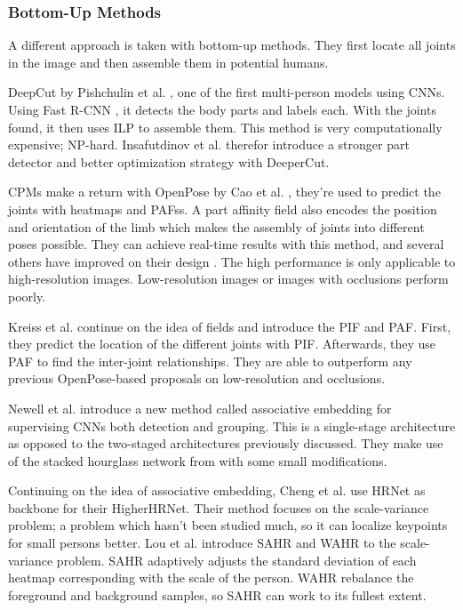 \subsubsection{Bottom-Up Methods}
A different approach is taken with bottom-up methods.
They first locate all joints in the image and then assemble them in potential humans.

DeepCut by Pishchulin et al. \cite{Pishchulin2015}, one of the first multi-person models using \glspl{CNN}.
Using Fast R-CNN \cite{Ren2015}, it detects the body parts and labels each.
With the joints found, it then uses \gls{ILP} to assemble them.
This method is very computationally expensive; NP-hard.
Insafutdinov et al. \cite{Insafutdinov2016} therefor introduce a stronger part detector and better optimization strategy with DeeperCut.

\gls{CPMs} make a return with OpenPose by Cao et al. \cite{Cao2018}, they're used to predict the joints with heatmaps and \glspl{PAFs}.
A part affinity field also encodes the position and orientation of the limb which makes the assembly of joints into different poses possible.
They can achieve real-time results with this method, and several others have improved on their design \cite{Zhu2017}\cite{Hidalgo2019}\cite{Li2019}.
The high performance is only applicable to high-resolution images.
Low-resolution images or images with occlusions perform poorly.

Kreiss et al. \cite{Kreiss2019} continue on the idea of fields and introduce the \gls{PIF} and \gls{PAF}.
First, they predict the location of the different joints with \gls{PIF}.
Afterwards, they use \gls{PAF} to find the inter-joint relationships.
They are able to outperform any previous OpenPose-based proposals on low-resolution and occlusions.

Newell et al. \cite{Newell2016-2} introduce a new method called associative embedding for supervising \glspl{CNN} both detection and grouping.
This is a single-stage architecture as opposed to the two-staged architectures previously discussed.
They make use of the stacked hourglass network from \cite{Newell2016} with some small modifications.

Continuing on the idea of associative embedding, Cheng et al. \cite{Cheng2019} use HRNet \cite{Sun2019} as backbone for their HigherHRNet.
Their method focuses on the scale-variance problem; a problem which hasn't been studied much, so it can localize keypoints for small persons better.
Lou et al. \cite{Lou2020} introduce \gls{SAHR} and \gls{WAHR} to the scale-variance problem.
\gls{SAHR} adaptively adjusts the standard deviation of each heatmap corresponding with the scale of the person.
\gls{WAHR} rebalance the foreground and background samples, so \gls{SAHR} can work to its fullest extent.

